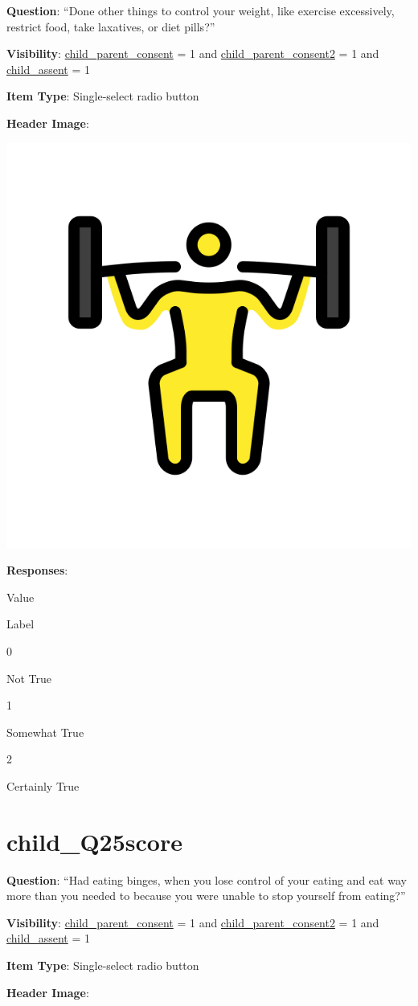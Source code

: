 \documentclass[]{book}
\begin{document}
\textbf{Question}: ``Done other things to control your weight, like exercise excessively, restrict food, take laxatives, or diet pills?''

\textbf{Visibility}: \protect\hyperlink{child_parent_consent}{child\_parent\_consent} = 1 and \protect\hyperlink{child_parent_consent2}{child\_parent\_consent2} = 1 and \protect\hyperlink{child_assent}{child\_assent} = 1

\textbf{Item Type}: Single-select radio button

\textbf{Header Image}:

\begin{flushleft}\includegraphics[width=0.33\linewidth]{downloadFigs4latex_HBN_PMHS_Codebook/child_Q24score_headerImg} \end{flushleft}

\textbf{Responses}:

Value

Label

0

Not True

1

Somewhat True

2

Certainly True

\hypertarget{child_q25score}{%
\section{child\_Q25score}\label{child_q25score}}

\textbf{Question}: ``Had eating binges, when you lose control of your eating and eat way more than you needed to because you were unable to stop yourself from eating?''

\textbf{Visibility}: \protect\hyperlink{child_parent_consent}{child\_parent\_consent} = 1 and \protect\hyperlink{child_parent_consent2}{child\_parent\_consent2} = 1 and \protect\hyperlink{child_assent}{child\_assent} = 1

\textbf{Item Type}: Single-select radio button

\textbf{Header Image}:
\end{document}
